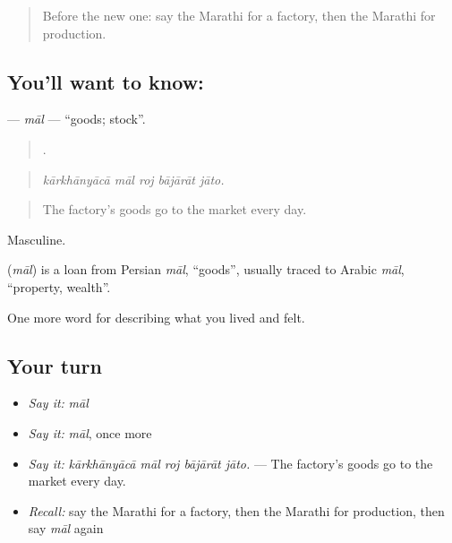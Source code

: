 \label{lesson:MR-C512-mal}



\begin{quote}
Before the new one: say the Marathi for a factory, then the Marathi for production.
\end{quote}

\subsection*{You'll want to know: }
\textbf{} — \emph{māl} — \textquotedblleft{}goods; stock\textquotedblright{}.

\begin{quote}
    .
\end{quote}

\begin{quote}
\emph{kārkhānyācā māl roj bājārāt jāto.}
\end{quote}

\begin{quote}
The factory's goods go to the market every day.
\end{quote}

Masculine.

\begin{cousinweb}
\textbf{} (\emph{māl}) is a loan from Persian \emph{māl}, \textquotedblleft{}goods\textquotedblright{}, usually traced to Arabic \emph{māl}, \textquotedblleft{}property, wealth\textquotedblright{}.
\end{cousinweb}

\begin{grammarlens}[title={What you've built}]
One more word for describing what you lived and felt.
\end{grammarlens}

\subsection*{Your turn}
\begin{itemize}
\raggedright
  \item \emph{Say it:} \emph{māl}
  \item \emph{Say it:} \emph{māl}, once more
  \item \emph{Say it:} \emph{kārkhānyācā māl roj bājārāt jāto.} — The factory's goods go to the market every day.
  \item \emph{Recall:} say the Marathi for a factory, then the Marathi for production, then say \emph{māl} again
\end{itemize}

